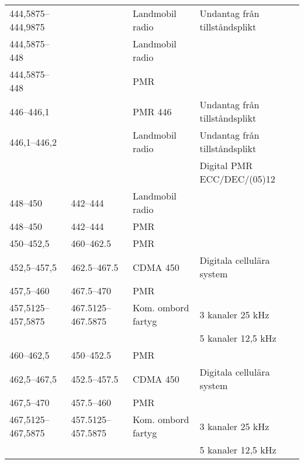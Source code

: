 \begin{landscape}
\begin{longtable}{llll}
	444,5875--444,9875 &                    & Landmobil radio         & Undantag från tillståndsplikt         \\
	444,5875--448      &                    & Landmobil radio         &                                       \\
	444,5875--448      &                    & PMR                     &                                       \\
	446--446,1         &                    & PMR 446                 & Undantag från tillståndsplikt         \\
	446,1--446,2       &                    & Landmobil radio         & Undantag från tillståndsplikt         \\
	                   &                    &                         & Digital PMR ECC/DEC/(05)12            \\
	448--450           & 442--444           & Landmobil radio         &                                       \\
	448--450           & 442--444           & PMR                     &                                       \\
	450--452,5         & 460--462.5         & PMR                     &                                       \\
	452,5--457,5       & 462.5--467.5       & CDMA 450                & Digitala cellulära system             \\
	457,5--460         & 467.5--470         & PMR                     &                                       \\
	457,5125--457,5875 & 467.5125--467.5875 & Kom. ombord fartyg      & 3 kanaler 25 kHz                      \\
	                   &                    &                         & 5 kanaler 12,5 kHz                    \\
	460--462,5         & 450--452.5         & PMR                     &                                       \\
	462,5--467,5       & 452.5--457.5       & CDMA 450                & Digitala cellulära system             \\
	467,5--470         & 457.5--460         & PMR                     &                                       \\
	467,5125--467,5875 & 457.5125--457.5875 & Kom. ombord  fartyg     & 3 kanaler 25 kHz                      \\
	                   &                    &                         & 5 kanaler 12,5 kHz                    \\

\end{longtable}
\end{landscape}
